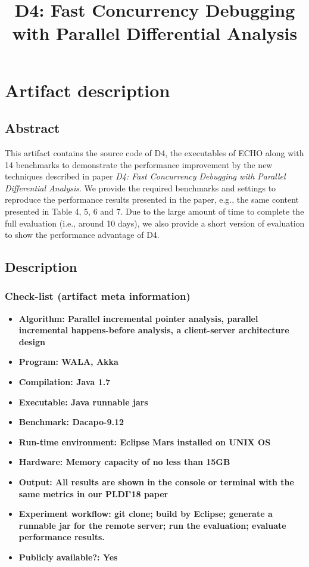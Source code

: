 \documentclass[preprint, number, 10pt]{sigplanconf}
\begin{document}
\setlength{\pdfpageheight}{\paperheight}
\setlength{\pdfpagewidth}{\paperwidth}


\title{D4: Fast Concurrency Debugging with Parallel Differential Analysis}
\subtitle{}

\maketitle

\appendix

\section{Artifact description}
\subsection{Abstract}
This artifact contains the source code of D4, the executables of ECHO along with 14 benchmarks to demonstrate the performance improvement
by the new techniques described in paper \textit{D4: Fast Concurrency Debugging with Parallel Differential Analysis}. We provide the required
benchmarks and settings to reproduce the performance results presented in the paper, e.g., the same content presented in Table 4, 5, 6 and 7. Due to the large amount of time to complete the full evaluation (i.e., around 10 days), we also provide a short version of evaluation to show the performance advantage of D4.

\subsection{Description}
\subsubsection{Check-list (artifact meta information)}
\begin{itemize}
\item \textbf{Algorithm: Parallel incremental pointer analysis, parallel incremental happens-before analysis, a client-server architecture design}
\item \textbf{Program: WALA, Akka}
\item \textbf{Compilation: Java 1.7}
\item \textbf{Executable: Java runnable jars}
\item \textbf{Benchmark: Dacapo-9.12}
\item \textbf{Run-time environment: Eclipse Mars installed on UNIX OS}
\item \textbf{Hardware: Memory capacity of no less than 15GB} %
\item \textbf{Output: All results are shown in the console or terminal with the same metrics in our PLDI'18 paper} %
\item \textbf{Experiment workflow: git clone; build by Eclipse; generate a runnable jar for the remote server;
run the evaluation; evaluate performance results.}
\item \textbf{Publicly available?: Yes}
\end{itemize}
\end{document}
